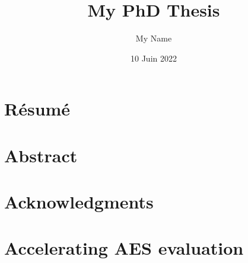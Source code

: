 \documentclass[11pt, twoside, openright]{thesis}
\title{My PhD Thesis}
\institute{l’École Normale Supérieure de Paris}
\author{My Name}
\date{10 Juin 2022}
\begin{document}
\frontmatter 
\hypersetup{pageanchor=false}
\maketitle
\hypersetup{pageanchor=true}
\dominitoc



\cleardoublepage
\chapter*{Résumé}
\thefrabstract{}
\vfill
\thefrkeywords{}
\cleardoublepage
\chapter*{Abstract}
\theenabstract{}
\vfill
\theenkeywords{}

\cleardoublepage
\chapter*{Acknowledgments}

\cleardoublepage
\hypertarget{contents}{}
\tableofcontents


\mainmatter






















\chapter{Accelerating AES evaluation}
\label{chap:hyppogriph}

\end{document}
